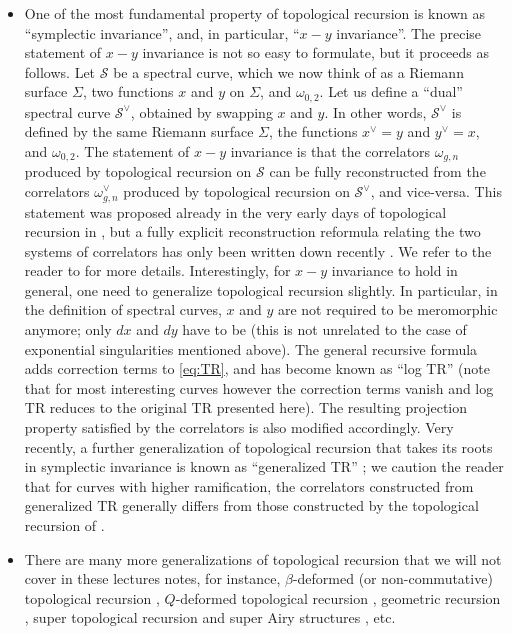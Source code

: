 \documentclass[reqno,oneside,11pt]{amsart}
\theoremstyle{plain}
\theoremstyle{definition}
\theoremstyle{remark}
\numberwithin{equation}{section}
\begin{document}
\begin{itemize}
\item One of the most fundamental property of topological recursion is known as ``symplectic invariance'', and, in particular, ``$x-y$ invariance''. The precise statement of $x-y$ invariance is not so easy to formulate, but it proceeds as follows. Let $\mathcal{S}$ be a spectral curve, which we now think of as a Riemann surface $\Sigma$, two functions $x$ and $y$ on $\Sigma$, and $\omega_{0,2}$. Let us define a ``dual'' spectral curve $\mathcal{S}^\vee$, obtained by swapping $x$ and $y$. In other words, $\mathcal{S}^\vee$ is defined by the same Riemann surface $\Sigma$, the functions $x^\vee = y$ and $y^\vee = x$, and $\omega_{0,2}$. The statement of $x-y$ invariance is that the correlators $\omega_{g,n}$ produced by topological recursion on $\mathcal{S}$ can be fully reconstructed from the correlators $\omega_{g,n}^\vee$ produced by topological recursion on $\mathcal{S}^\vee$, and vice-versa. This statement was proposed already in the very early days of topological recursion in \cite{EO07,EO07b}, but a fully explicit reconstruction reformula relating the two systems of correlators has only been written down recently \cite{ABDKS23}. We refer to the reader to \cite{ABDKS23} for more details. Interestingly, for $x-y$ invariance to hold in general, one need to generalize topological recursion slightly. In particular, in the definition of spectral curves, $x$ and $y$ are not required to be meromorphic anymore; only $dx$ and $dy$ have to be (this is not unrelated to the case of exponential singularities mentioned above). The general recursive formula adds correction terms to \eqref{eq:TR}, and has become known as ``log TR'' \cite{ABDKS23} (note that for most interesting curves however the correction terms vanish and log TR reduces to the original TR presented here). The resulting projection property satisfied by the correlators is also modified accordingly. Very recently, a further generalization of topological recursion that takes its roots in symplectic invariance is known as ``generalized TR'' \cite{ABDKS24}; we caution the reader that for curves with higher ramification, the correlators constructed from generalized TR generally differs from those constructed by the topological recursion of \cite{BE13}.
\item There are many more generalizations of topological recursion that we will not cover in these lectures notes, for instance, $\beta$-deformed (or non-commutative) topological recursion \cite{EM08,CEM09,CEM11,BE18,BE19,BBCC21}, $Q$-deformed topological recursion \cite{KO22,Os23}, geometric recursion \cite{ABO17}, super topological recursion and super Airy structures \cite{BCHORS19,BO20}, etc.
\end{itemize} 
\end{document}
